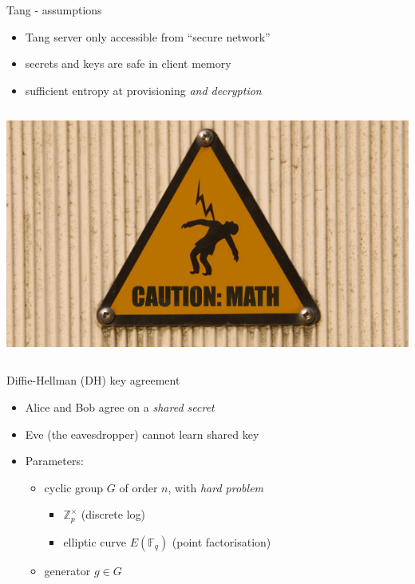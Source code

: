 \documentclass[ignorenonframetext,aspectratio=169]{beamer}
\begin{document}
\begin{frame}{Tang - assumptions}
\protect\hypertarget{tang---assumptions}{}

\begin{itemize}
\item Tang server only accessible from ``secure network''
\item secrets and keys are safe in client memory
\item sufficient entropy at provisioning {\em and decryption}
\end{itemize}

\end{frame}

\begin{frame}[plain]
\begin{columns}
\column{\dimexpr\paperwidth}
  \includegraphics[height=\paperheight]{caution.jpg}
\end{columns}
\end{frame}

\begin{frame}{Diffie-Hellman (DH) key agreement}
\protect\hypertarget{diffie-hellman-exchange}{}
\begin{itemize}
\normalsize
\item Alice and Bob agree on a \emph{shared secret}
\item Eve (the eavesdropper) cannot learn shared key
\item Parameters:
    \begin{itemize}
	\normalsize
	\item cyclic group \(G\) of order \(n\), with \emph{hard problem}
	  \begin{itemize}
	    \normalsize
	  \item \(ℤ^\times_p\) (discrete log)
	  \item elliptic curve \(E(𝔽_q)\) (point factorisation)
	  \end{itemize}
	\item generator \(g \in G\)
    \end{itemize}
\end{itemize}
\end{frame}
\end{document}
